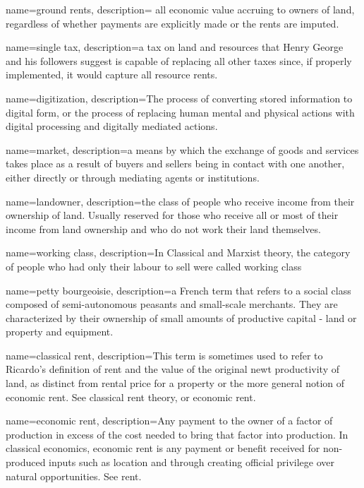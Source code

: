 {
name=ground rents,
description={ all economic value accruing to owners of land, regardless of whether payments are explicitly made or the rents are imputed.}
}

{
name=single tax,
description={a tax on land and resources that Henry George and his followers suggest is capable of replacing all other taxes since, if properly implemented, it would capture all resource rents. }
}

{
name=digitization,
description={The process of converting stored information to digital form, or the process of replacing human mental and physical actions with digital processing and digitally mediated actions.}
}

{
name=market,
description={a means by which the exchange of goods and services takes place as a result of buyers and sellers being in contact with one another, either directly or through mediating agents or institutions.}%
}

{
name=landowner,
description={the class of people who receive income from their ownership of land. Usually reserved for those who receive all or most of their income from land ownership and who do not work their land themselves.}
}

{
name=working class,
description={In Classical and Marxist theory, the category of people who had only their labour to sell were called working class}
}


{
name=petty bourgeoisie,
description={a French term that refers to a social class composed of semi-autonomous peasants and small-scale merchants. They are characterized by their ownership of small amounts of productive capital - land or property and equipment.}
}

{
name=classical rent,
description={This term is sometimes used to refer to Ricardo's definition of rent and the value of the original newt productivity of land, as distinct from rental price for a property or the more general notion of economic rent. See \gls{classical rent theory}, or \gls{economic rent}.}
}

{
name=economic rent,
description={Any payment to the owner of a factor of production in excess of the cost needed to bring that factor into production. In classical economics, economic rent is any payment or benefit received for non-produced inputs such as location and through creating official privilege over natural opportunities. See \gls{rent}.}
}

